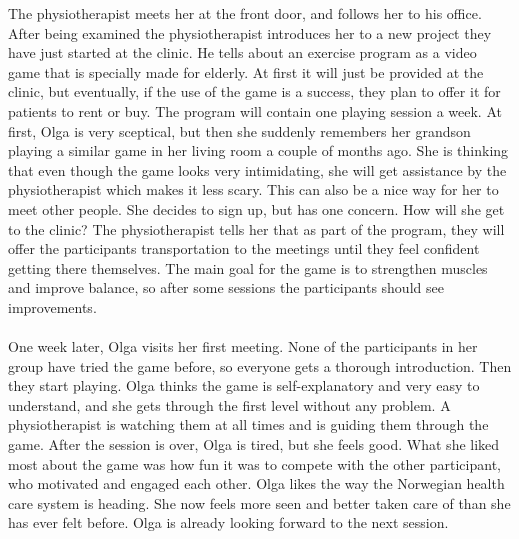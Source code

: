 The physiotherapist meets her at the front door, and follows her to his office. After being examined the physiotherapist introduces her to a new project they have just started at the clinic. He tells about an exercise program as a video game that is specially made for elderly. At first it will just be provided at the clinic, but eventually, if the use of the game is a success, they plan to offer it for patients to rent or buy. The program will contain one playing session a week. At first, Olga is very sceptical, but then she suddenly remembers her grandson playing a similar game in her living room a couple of months ago. She is thinking that even though the game looks very intimidating, she will get assistance by the physiotherapist which makes it less scary. This can also be a nice way for her to meet other people. She decides to sign up, but has one concern. How will she get to the clinic? The physiotherapist tells her that as part of the program, they will offer the participants transportation to the meetings until they feel confident getting there themselves. The main goal for the game is to strengthen muscles and improve balance, so after some sessions the participants should see improvements. \\ \\
One week later, Olga visits her first meeting. None of the participants in her group have tried the game before, so everyone gets a thorough introduction. Then they start playing. Olga thinks the game is self-explanatory and very easy to understand, and she gets through the first level without any problem. A physiotherapist is watching them at all times and is guiding them through the game. After the session is over, Olga is tired, but she feels good. What she liked most about the game was how fun it was to compete with the other participant, who motivated and engaged each other. Olga likes the way the Norwegian health care system is heading. She now feels more seen and better taken care of than she has ever felt before. Olga is already looking forward to the next session.

